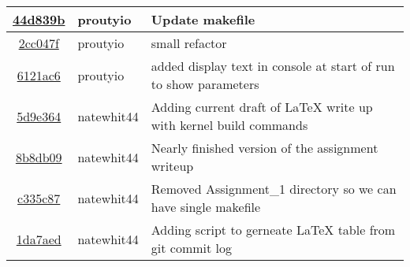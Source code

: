 \begin{tabular}{| c | l | l |}
\href{https://github.com/proutyio/OSU_CS444/commit/44d839bc92cf0e4ecbe8015cf2857e80e2a9fcf5}{44d839b} & proutyio & Update makefile\\\hline
\href{https://github.com/proutyio/OSU_CS444/commit/2cc047f08a9c3fa13c30905f6ffcf4d3067497d8}{2cc047f} & proutyio & small refactor\\\hline
\href{https://github.com/proutyio/OSU_CS444/commit/6121ac6e5453cab5ffe44448281b842eac6c778e}{6121ac6} & proutyio & added display text in console at start of run to show parameters\\\hline
\href{https://github.com/proutyio/OSU_CS444/commit/5d9e3643d83b9092afdb37d7a98c30c822c2a1e6}{5d9e364} & natewhit44 & Adding current draft of LaTeX write up with kernel build commands\\\hline
\href{https://github.com/proutyio/OSU_CS444/commit/8b8db09905b59bd51df0ad0ab2473ff98a56a39d}{8b8db09} & natewhit44 & Nearly finished version of the assignment writeup\\\hline
\href{https://github.com/proutyio/OSU_CS444/commit/c335c8715109bf6bda6712b402b51b97267a372a}{c335c87} & natewhit44 & Removed Assignment\_1 directory so we can have single makefile\\\hline
\href{https://github.com/proutyio/OSU_CS444/commit/1da7aed9fcd7b98563d61560fc9d8320f7906cec}{1da7aed} & natewhit44 & Adding script to gerneate LaTeX table from git commit log\\\hline
\end{tabular}
